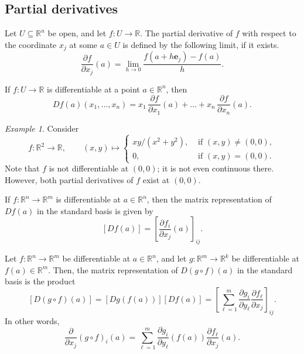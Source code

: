\documentclass[11pt]{article}
\newcommand{\R}{\mathbb{R}}
\renewcommand{\vec}[1]{\boldsymbol{#1}}
\newcommand{\pp}[2]{\frac{\partial #1}{\partial #2}}
\theoremstyle{definition}
\theoremstyle{remark}
\newtheorem*{example}{Example}
\numberwithin{equation}{section}
\begin{document}
    \subsection{Partial derivatives}

    \begin{definition}
        Let $U \subseteq \R^n$ be open, and let $f\colon U \to \R$. The partial
        derivative of $f$ with respect to the coordinate $x_j$ at some $a \in U$
        is defined by the following limit, if it exists. \[
            \pp{f}{x_j}(a) = \lim_{h \to 0} \frac{f(a + h\vec{e}_j) - f(a)}{h}.
        \] 
    \end{definition}
    \begin{lemma}
        If $f\colon U \to \R$ is differentiable at a point $a \in \R^n$, then \[
            Df(a)(x_1, \dots, x_n) = x_1 \,\pp{f}{x_1}(a) + \dots + x_n
            \,\pp{f}{x_n}(a).
        \] 
    \end{lemma}
    \begin{example}
        Consider \[
            f\colon \R^2 \to \R, \qquad (x, y) \mapsto \begin{cases}
                xy/(x^2 + y^2), &\text{ if } (x, y) \neq (0, 0), \\
                0, &\text{ if } (x, y) = (0, 0).
            \end{cases}
        \] Note that $f$ is not differentiable at $(0, 0)$; it is not even continuous
        there. However, both partial derivatives of $f$ exist at $(0, 0)$.
    \end{example}

    \begin{lemma}
        If $f\colon \R^n \to \R^m$ is differentiable at $a \in \R^n$, then the matrix
        representation of $Df(a)$ in the standard basis is given by \[
            [Df(a)] = \left[\pp{f_i}{x_j}(a)\right]_{ij}.
        \] 
    \end{lemma}

    \begin{lemma}
        Let $f\colon \R^n \to \R^m$ be differentiable at $a \in \R^n$, and let
        $g\colon \R^m \to \R^k$ be differentiable at $f(a) \in \R^m$. Then, the
        matrix representation of $D(g\circ f)(a)$ in the standard basis is the
        product \[
            [D(g\circ f)(a)] = [Dg(f(a))][Df(a)] = \left[\sum_{\ell = 1}^m
            \pp{g_i}{y_\ell}\pp{f_\ell}{x_j}\right]_{ij}.
        \] In other words, \[
            \pp{}{x_j}(g\circ f)_i(a) = \sum_{\ell = 1}^m \pp{g_i}{y_\ell}(f(a))
            \pp{f_\ell}{x_j}(a).
        \] 
    \end{lemma}
\end{document}

